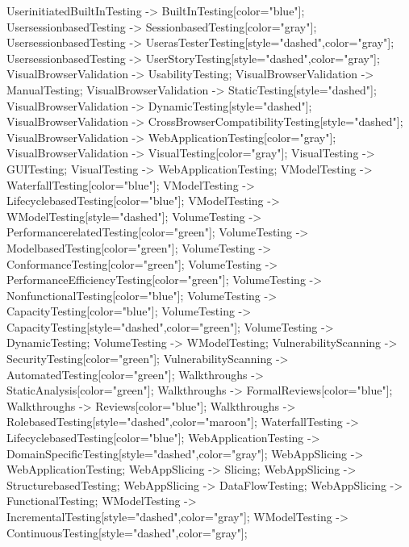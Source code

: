 \documentclass{article}
\begin{document}
{UserinitiatedBuiltInTesting -> BuiltInTesting[color="blue"];
UsersessionbasedTesting -> SessionbasedTesting[color="gray"];
UsersessionbasedTesting -> UserasTesterTesting[style="dashed",color="gray"];
UsersessionbasedTesting -> UserStoryTesting[style="dashed",color="gray"];
VisualBrowserValidation -> UsabilityTesting;
VisualBrowserValidation -> ManualTesting;
VisualBrowserValidation -> StaticTesting[style="dashed"];
VisualBrowserValidation -> DynamicTesting[style="dashed"];
VisualBrowserValidation -> CrossBrowserCompatibilityTesting[style="dashed"];
VisualBrowserValidation -> WebApplicationTesting[color="gray"];
VisualBrowserValidation -> VisualTesting[color="gray"];
VisualTesting -> GUITesting;
VisualTesting -> WebApplicationTesting;
VModelTesting -> WaterfallTesting[color="blue"];
VModelTesting -> LifecyclebasedTesting[color="blue"];
VModelTesting -> WModelTesting[style="dashed"];
VolumeTesting -> PerformancerelatedTesting[color="green"];
VolumeTesting -> ModelbasedTesting[color="green"];
VolumeTesting -> ConformanceTesting[color="green"];
VolumeTesting -> PerformanceEfficiencyTesting[color="green"];
VolumeTesting -> NonfunctionalTesting[color="blue"];
VolumeTesting -> CapacityTesting[color="blue"];
VolumeTesting -> CapacityTesting[style="dashed",color="green"];
VolumeTesting -> DynamicTesting;
VolumeTesting -> WModelTesting;
VulnerabilityScanning -> SecurityTesting[color="green"];
VulnerabilityScanning -> AutomatedTesting[color="green"];
Walkthroughs -> StaticAnalysis[color="green"];
Walkthroughs -> FormalReviews[color="blue"];
Walkthroughs -> Reviews[color="blue"];
Walkthroughs -> RolebasedTesting[style="dashed",color="maroon"];
WaterfallTesting -> LifecyclebasedTesting[color="blue"];
WebApplicationTesting -> DomainSpecificTesting[style="dashed",color="gray"];
WebAppSlicing -> WebApplicationTesting;
WebAppSlicing -> Slicing;
WebAppSlicing -> StructurebasedTesting;
WebAppSlicing -> DataFlowTesting;
WebAppSlicing -> FunctionalTesting;
WModelTesting -> IncrementalTesting[style="dashed",color="gray"];
WModelTesting -> ContinuousTesting[style="dashed",color="gray"];

}
\end{document}
